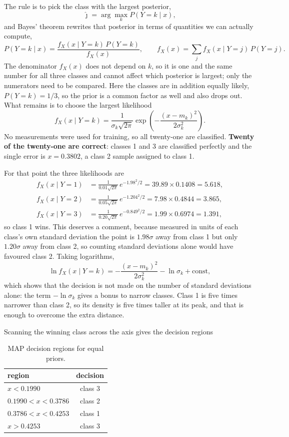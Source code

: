 \documentclass[11pt]{article}
\begin{document}
The rule is to pick the class with the largest posterior,
\[
    \hat{\jmath} = \arg\max_k P(Y = k \mid x),
\]
and Bayes' theorem rewrites that posterior in terms of quantities we can
actually compute,
\[
    P(Y = k \mid x) = \frac{f_X(x \mid Y = k)\, P(Y = k)}{f_X(x)},
    \qquad
    f_X(x) = \sum_j f_X(x \mid Y = j)\, P(Y = j).
\]
The denominator $f_X(x)$ does not depend on $k$, so it is one and the same
number for all three classes and cannot affect which posterior is largest;
only the numerators need to be compared. Here the classes are in addition
equally likely, $P(Y=k) = 1/3$, so the prior is a common factor as well and
also drops out. What remains is to choose the largest likelihood
\[
    f_X(x \mid Y = k)
    = \frac{1}{\sigma_k \sqrt{2\pi}}
      \exp\!\left(-\frac{(x - m_k)^2}{2\sigma_k^2}\right).
\]
No measurements were used for training, so all twenty-one are classified.
\textbf{Twenty of the twenty-one are correct}: classes 1 and 3 are classified
perfectly and the single error is $x = 0.3802$, a class 2 sample assigned to
class 1.

For that point the three likelihoods are
\begin{align*}
    f_X(x \mid Y = 1) &= \frac{1}{0.01\sqrt{2\pi}}\,e^{-1.98^2/2}
      = 39.89 \times 0.1408 = 5.618, \\
    f_X(x \mid Y = 2) &= \frac{1}{0.05\sqrt{2\pi}}\,e^{-1.204^2/2}
      = 7.98 \times 0.4844 = 3.865, \\
    f_X(x \mid Y = 3) &= \frac{1}{0.20\sqrt{2\pi}}\,e^{-0.849^2/2}
      = 1.99 \times 0.6974 = 1.391,
\end{align*}
so class 1 wins. This deserves a comment, because measured in units of each
class's own standard deviation the point is $1.98\sigma$ away from class 1 but
only $1.20\sigma$ away from class 2, so counting standard deviations alone
would have favoured class 2. Taking logarithms,
\[
    \ln f_X(x \mid Y = k) = -\frac{(x-m_k)^2}{2\sigma_k^2} - \ln \sigma_k
    + \text{const},
\]
which shows that the decision is not made on the number of standard deviations
alone: the term $-\ln \sigma_k$ gives a bonus to narrow classes. Class 1 is
five times narrower than class 2, so its density is five times taller at its
peak, and that is enough to overcome the extra distance.

Scanning the winning class across the axis gives the decision regions

\begin{table}[H]
    \centering
    \begin{tabular}{lc}
        \toprule
        region & decision \\
        \midrule
        $x < 0.1990$ & class 3 \\
        $0.1990 < x < 0.3786$ & class 2 \\
        $0.3786 < x < 0.4253$ & class 1 \\
        $x > 0.4253$ & class 3 \\
        \bottomrule
    \end{tabular}
    \caption{MAP decision regions for equal priors.}
\end{table}
\end{document}
